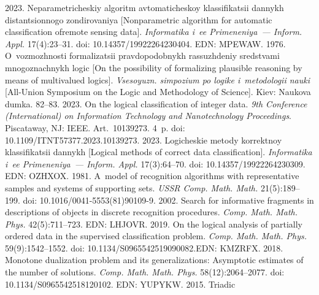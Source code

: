 \begin{multicols}{2}
{{\begin{thebibliography}{99}
 2023. Neparametricheskiy algoritm 
avtomaticheskoy klassifikatsii dannykh distantsionnogo zondirovaniya [Nonparametric 
algorithm for automatic classification of\linebreak remote sensing data]. \textit{Informatika i~ee 
Primeneniya~--- Inform. Appl.} 17(4):23--31. doi: 10.14357/19922264230404. EDN: 
MPEWAW.
 1976. O~vozmozhnosti formalizatsii pravdopodobnykh rassuzhdeniy 
sredstvami mnogoznachnykh logic [On the possibility of formalizing plausible reasoning by 
means of multivalued logics]. \textit{Vsesoyuzn. simpozium po logike i~metodologii nauki}  
[All-Union Symposium on the Logic and Methodology of Science]. Kiev: Naukova dumka.  
82--83.
 2023. On the logical classification of integer 
data. \textit{9th Conference (International)  on Information Technology and Nanotechnology 
Proceedings}. Piscataway, NJ: IEEE. Art.~10139273. 4~p. doi: 
10.1109/ITNT57377.2023.10139273. 
 2023. Logicheskie metody 
korrektnoy klassifikatsii dannykh [Logical methods of correct data classification]. 
\textit{Informatika i~ee Primeneniya~--- Inform. Appl.} 17(3):64--70. doi: 
10.14357/19922264230309. EDN: OZHXOX.
 1981. A~model of recognition algorithms with 
representative samples and systems of supporting sets. \textit{USSR Comp. Math. Math.} 
21(5):189--199. doi: 10.1016/0041-5553(81)90109-9.
 2002. Search for informative fragments in descriptions 
of objects in discrete recognition procedures. \textit{Comp. Math. Math. Phys.} 42(5):711--723. 
EDN: LHJOVR.
 2019. On the logical analysis of 
partially ordered data in the supervised classification problem. \textit{Comp. Math. Math. Phys.} 
59(9):1542--1552. doi: 10.1134/S0965542519090082.\linebreak EDN:  KMZRFX.
 2018. Monotone dualization problem and its 
generalizations: Asymptotic estimates of the number of solutions. \textit{Comp. Math.  Math. 
Phys.} 58(12):2064--2077. doi: 10.1134/S0965542518120102. EDN: YUPYKW.
 2015. Triadic 

\end{thebibliography}}}
\end{multicols}
